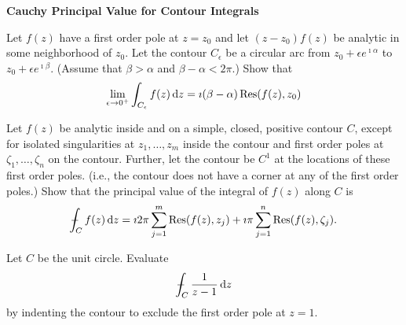 {\begin{Exercise}
\end{Exercise}





\begin{large}
  \noindent
  \textbf{Cauchy Principal Value for Contour Integrals}
\end{large}



\begin{Exercise}
  \label{exercise int ce f(z)}
  Let $f(z)$ have a first order pole at $z=z_0$ and let $(z-z_0)f(z)$ be
  analytic in some neighborhood of $z_0$.  Let the contour $C_\epsilon$ be a
  circular arc from $z_0 + \epsilon e^{\imath \alpha}$ to $z_0 + \epsilon e^{\imath \beta}$.  (Assume
  that $\beta > \alpha$ and $\beta - \alpha < 2\pi$.)  Show that
  \[
  \lim_{\epsilon \to 0^+} \int_{C_\epsilon} f(z) \,\mathrm{d} z = \imath (\beta - \alpha) \mathop{\mathrm{Res}}\nolimits( f(z), z_0 )
  \]

\end{Exercise}



\begin{Exercise}
  \label{exercise cpv res thrm}
  Let $f(z)$ be analytic inside and on a simple, closed, positive contour $C$,
  except for isolated singularities at $z_1,\ldots,z_m$ inside the contour 
  and first order poles at $\zeta_1,\ldots,\zeta_n$
  on the contour.  Further, let the contour be $C^1$ at the locations of these
  first order poles. (i.e., the contour does not have a corner at any of the
  first order poles.)  Show that the principal value of the integral of $f(z)$
  along $C$ is
  \[
  - \negthickspace \negthickspace \negthickspace \negmedspace \int_C f(z) \,\mathrm{d} z = \imath 2 \pi \sum_{j=1}^m \mathop{\mathrm{Res}}\nolimits(f(z),z_j)
  + \imath \pi \sum_{j=1}^n \mathop{\mathrm{Res}}\nolimits(f(z),\zeta_j).
  \]

\end{Exercise}



\begin{Exercise}
  \label{exercise 1/(z-1)}
  Let $C$ be the unit circle.
  Evaluate
  \[
  - \negthickspace \negthickspace \negthickspace \negmedspace \int_C \frac{1}{z-1} \,\mathrm{d} z
  \]
  by indenting the contour to exclude the first order pole at $z=1$.

\end{Exercise}




}
